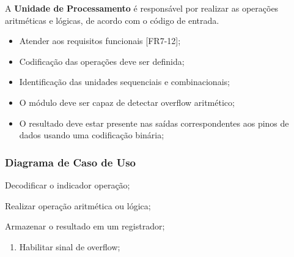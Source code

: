   A \textbf{Unidade de Processamento} é responsável por realizar as operações aritméticas e lógicas, de acordo com o código de entrada.
  
  \actors
    \begin{description}
    \end{description}
  
  \preconditions 
    \begin{itemize}
     \item Atender aos requisitos funcionais [FR7-12];
     \item Codificação das operações deve ser definida;
     \item Identificação das unidades sequenciais e combinacionais;
    \end{itemize}

  \postconditions
    \begin{itemize}
     \item O módulo deve ser capaz de detectar overflow aritmético;
     \item O resultado deve estar presente nas saídas correspondentes aos pinos de dados usando uma codificação binária;
    \end{itemize}
  
  \subsubsection*{Diagrama de Caso de Uso}
  
 
  
  \begin{mainflow}
    \item Decodificar o indicador operação;
    \item Realizar operação aritmética ou lógica;
    \item Armazenar o resultado em um registrador;
  \end{mainflow}
  
  \begin{secondaryflow} 
    \begin{enumerate}
      \item Habilitar sinal de overflow;
    \end{enumerate}
  \end{secondaryflow} 